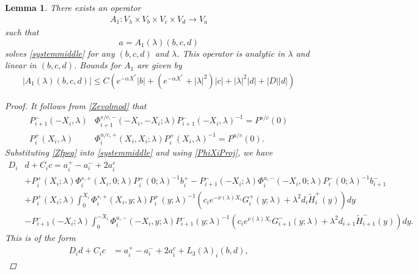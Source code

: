 \documentclass[10pt,reqno]{amsart}
\theoremstyle{plain}
\newtheorem{lemma}[theorem]{Lemma}
\theoremstyle{definition}
\theoremstyle{remark}
\numberwithin{theorem}{section}
\numberwithin{equation}{section}
\begin{document}
\begin{lemma}\label{Zinv1}
There exists an operator
\begin{align*}
A_1: V_\lambda \times V_b \times V_c \times V_d \rightarrow V_a
\end{align*}
such that 
\[
a = A_1(\lambda)(b, c, d)
\]
solves \eqref{systemmiddle} for any $(b, c, d)$ and $\lambda$. This operator is analytic in $\lambda$ and linear in $(b, c, d)$. Bounds for $A_1$ are given by
\begin{align}\label{A1bound}
|A_1(\lambda)(b, c, d)| \leq C \left( e^{-\alpha X^*} |b| + (e^{-\alpha X^*} + |\lambda|^2)|c| + |\lambda|^2 |d| + |D||d| \right)
\end{align} 

\begin{proof}
It follows from \cref{Zevolmod} that
\begin{equation}\label{PhiXiProj}
\begin{aligned}
P_{i+1}^-(-X_i, \lambda) &\Phi_{i+1}^{s/c,-}(-X_i, -X_i; \lambda) P_{i+1}^-(-X_i, \lambda)^{-1} = P^{s/c}(0) \\
P_i^+(X_i, \lambda) &\Phi^{u/c,+}_{i}(X_i, X_i; \lambda) P_i^+(X_i, \lambda)^{-1} = P^{u/c}(0).
\end{aligned}
\end{equation}
Substituting \cref{Zfpeq} into \cref{systemmiddle} and using \cref{PhiXiProj}, we have
\begin{equation}\label{Didexpansion}
\begin{aligned}
D_i &d + C_i c = a_i^+ - a_i^- + 2 a_i^c \\
&+ P_i^+(X_i; \lambda)\Phi_i^{s,+}(X_i, 0; \lambda) P_i^+(0; \lambda)^{-1} b_i^+ - P_{i+1}^-(-X_i; \lambda)\Phi_i^{u,-}(-X_i, 0; \lambda) P_i^-(0; \lambda)^{-1} b_{i+1}^- \\
&+ P_i^+(X_i; \lambda) \int_0^{X_i} \Phi_i^{s,+}(X_i, y; \lambda)P_i^+(y; \lambda)^{-1} (c_i e^{-\nu(\lambda)X_i} G_i^+(y; \lambda) + \lambda^2 d_i \tilde{H}_i^+(y)) dy \\ 
&- P_{i+1}^-(-X_i; \lambda) \int_0^{-X_i} \Phi_i^{u,-}(-X_i, y; \lambda) P_{i+1}^-(y; \lambda)^{-1}(c_i e^{\nu(\lambda)X_i} G_{i+1}^-(y; \lambda) + \lambda^2 d_{i+1} \tilde{H}_{i+1}^-(y)) dy.
\end{aligned}
\end{equation}
This is of the form
\begin{align}\label{Dideq1}
D_i d + C_i c &= a_i^+ - a_i^- + 2 a_i^c + L_3(\lambda)_i(b, d),
\end{align}

\end{proof}
\end{lemma}
\end{document}
